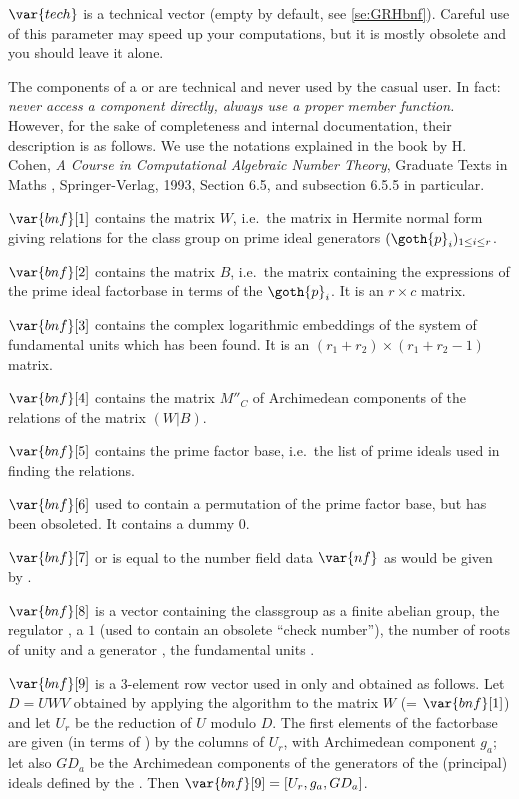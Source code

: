 $\var{tech}$ is a technical vector (empty by default, see \ref{se:GRHbnf}).
Careful use of this parameter may speed up your computations,
but it is mostly obsolete and you should leave it alone.

\smallskip

The components of a  or  are technical and never used by
the casual user. In fact: \emph{never access a component directly, always use
a proper member function.} However, for the sake of completeness and internal
documentation, their description is as follows. We use the notations
explained in the book by H. Cohen, \emph{A Course in Computational Algebraic
Number Theory}, Graduate Texts in Maths , Springer-Verlag, 1993,
Section 6.5, and subsection 6.5.5 in particular.

$\var{bnf}[1]$ contains the matrix $W$, i.e.~the matrix in Hermite normal
form giving relations for the class group on prime ideal generators
$(\goth{p}_i)_{1\le i\le r}$.

$\var{bnf}[2]$ contains the matrix $B$, i.e.~the matrix containing the
expressions of the prime ideal factorbase in terms of the $\goth{p}_i$.
It is an $r\times c$ matrix.

$\var{bnf}[3]$ contains the complex logarithmic embeddings of the system of
fundamental units which has been found. It is an $(r_1+r_2)\times(r_1+r_2-1)$
matrix.

$\var{bnf}[4]$ contains the matrix $M''_C$ of Archimedean components of the
relations of the matrix $(W|B)$.

$\var{bnf}[5]$ contains the prime factor base, i.e.~the list of prime
ideals used in finding the relations.

$\var{bnf}[6]$ used to contain a permutation of the prime factor base, but
has been obsoleted. It contains a dummy $0$.

$\var{bnf}[7]$ or  is equal to the number field data
$\var{nf}$ as would be given by .

$\var{bnf}[8]$ is a vector containing the classgroup 
as a finite abelian group, the regulator , a $1$ (used to
contain an obsolete ``check number''), the number of roots of unity and a
generator , the fundamental units .

$\var{bnf}[9]$ is a 3-element row vector used in  only
and obtained as follows. Let $D = U W V$ obtained by applying the
 algorithm to the matrix $W$ (= $\var{bnf}[1]$) and
let $U_r$ be the reduction of $U$ modulo $D$. The first elements of the
factorbase are given (in terms of ) by the columns of $U_r$,
with Archimedean component $g_a$; let also $GD_a$ be the Archimedean
components of the generators of the (principal) ideals defined by the
. Then $\var{bnf}[9]=[U_r, g_a, GD_a]$.

